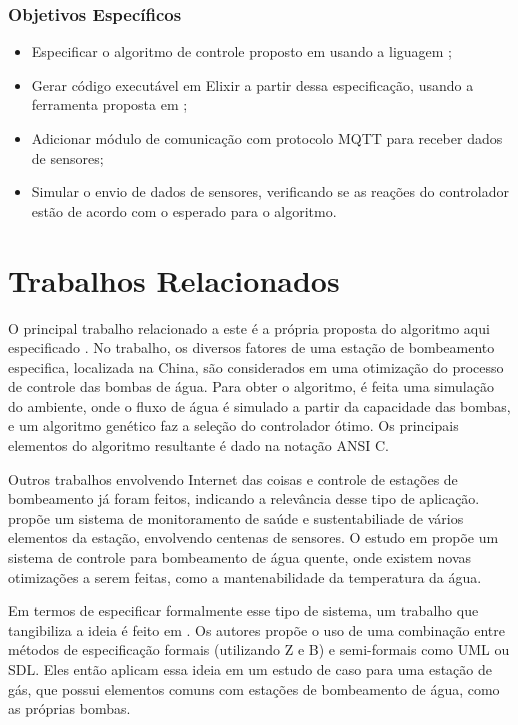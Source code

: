 \documentclass[12pt]{article}
\begin{document}
\subsubsection{Objetivos Específicos}
\begin{itemize}
  \item Especificar o algoritmo de controle proposto em \cite{pumps} usando a liguagem \TLA;
  \item Gerar código executável em Elixir a partir dessa especificação, usando a
    ferramenta proposta em \cite{tcc};
  \item Adicionar módulo de comunicação com protocolo MQTT para receber dados de
    sensores;
  \item Simular o envio de dados de sensores, verificando se as reações do
    controlador estão de acordo com o esperado para o algoritmo.
\end{itemize}

\section{Trabalhos Relacionados}

O principal trabalho relacionado a este é a própria proposta do algoritmo aqui
especificado \cite{pumps}. No trabalho, os diversos fatores de uma estação de
bombeamento especifica, localizada na China, são considerados em uma otimização
do processo de controle das bombas de água. Para obter o algoritmo, é feita uma
simulação do ambiente, onde o fluxo de água é simulado a partir da capacidade
das bombas, e um algoritmo genético faz a seleção do controlador ótimo. Os
principais elementos do algoritmo resultante é dado na notação ANSI C.

Outros trabalhos envolvendo Internet das coisas e controle de estações de
bombeamento já foram feitos, indicando a relevância desse tipo de aplicação.
\cite{feng} propõe um sistema de monitoramento de saúde e sustentabiliade de
vários elementos da estação, envolvendo centenas de sensores. O estudo em
\cite{hotwater} propõe um sistema de controle para bombeamento de água quente,
onde existem novas otimizações a serem feitas, como a mantenabilidade da
temperatura da água.

Em termos de especificar formalmente esse tipo de sistema, um trabalho que
tangibiliza a ideia é feito em \cite{gas}. Os autores propõe o uso de uma
combinação entre métodos de especificação formais (utilizando Z e B) e
semi-formais como UML ou SDL. Eles então aplicam essa ideia em um estudo de caso
para uma estação de gás, que possui elementos comuns com estações de bombeamento
de água, como as próprias bombas.
\end{document}
